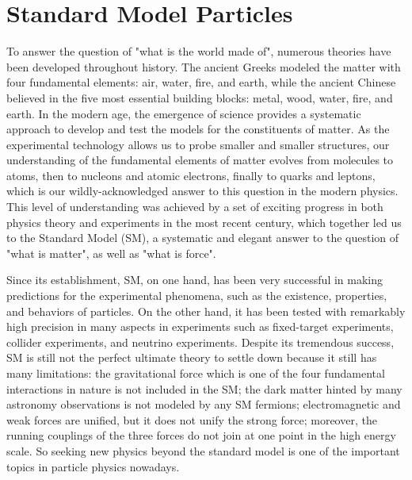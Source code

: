 
\section{Standard Model Particles}
\label{sec:relatedWorks:smParticles}

To answer the question of "what is the world made of", numerous theories have been developed throughout history. The ancient Greeks modeled the matter with four fundamental elements: air, water, fire, and earth, while the ancient Chinese believed in the five most essential building blocks: metal, wood, water, fire, and earth. In the modern age, the emergence of science provides a systematic approach to develop and test the models for the constituents of matter. As the experimental technology allows us to probe smaller and smaller structures, our understanding of the fundamental elements of matter evolves from molecules to atoms, then to nucleons and atomic electrons, finally to quarks and leptons, which is our wildly-acknowledged answer to this question in the modern physics. This level of understanding was achieved by a set of exciting progress in both physics theory and experiments in the most recent century, which together led us to the Standard Model (SM), a systematic and elegant answer to the question of "what is matter", as well as "what is force".

Since its establishment, SM, on one hand, has been very successful in making predictions for the experimental phenomena, such as the existence, properties, and behaviors of particles. On the other hand, it has been tested with remarkably high precision in many aspects in experiments such as fixed-target experiments, collider experiments, and neutrino experiments. Despite its tremendous success, SM is still not the perfect ultimate theory to settle down because it still has many limitations: the gravitational force which is one of the four fundamental interactions in nature is not included in the SM; the dark matter hinted by many astronomy observations is not modeled by any SM fermions; electromagnetic and weak forces are unified, but it does not unify the strong force; moreover, the running couplings of the three forces do not join at one point in the high energy scale. So seeking new physics beyond the standard model is one of the important topics in particle physics nowadays. 


